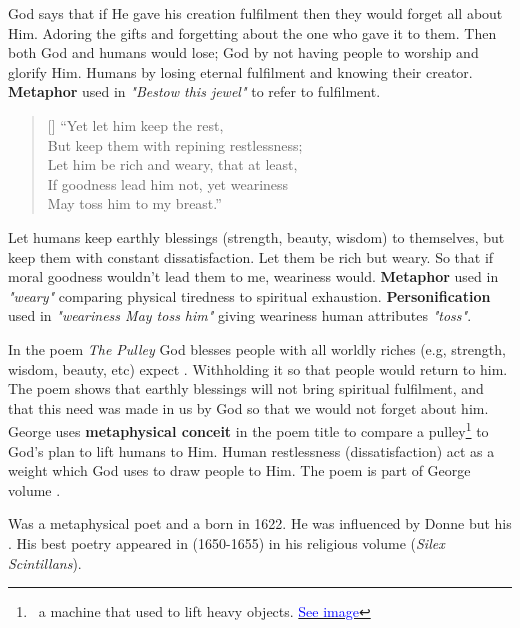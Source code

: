 God says that if He gave his creation fulfilment then they would 
forget all about Him. Adoring the gifts and forgetting 
about the one who gave it to them. Then both God and humans would
lose; God by not having people to worship and glorify Him. Humans by
losing eternal fulfilment and knowing their creator.  \textbf{Metaphor}
used in \textit{"Bestow this jewel"} to refer to fulfilment.

\begin{verse}[\versewidth]
{\fontverse
“Yet let him keep the rest,\\
But keep them with repining restlessness;\\
Let him be rich and weary, that at least,\\
If goodness lead him not, yet weariness\\
May toss him to my breast.”
} 
\end{verse}

Let humans keep earthly blessings (strength, beauty, wisdom) to
themselves, but keep them with constant dissatisfaction. Let them 
be rich but weary. So that if moral goodness wouldn't lead them
to me, weariness would. \textbf{Metaphor} used in \textit{"weary"}
comparing physical tiredness to spiritual exhaustion. \textbf{Personification}
used in \textit{"weariness May toss him"} giving weariness human attributes \textit{"toss"}.


In the poem \textit{The Pulley} God blesses people with all worldly riches
(e.g, strength, wisdom, beauty, etc) expect . Withholding
it so that people would return to him. The poem shows that earthly blessings will not
bring spiritual fulfilment, and that this need was made in us by God so that we would not forget
about him. George uses \textbf{metaphysical conceit} in the poem title to compare a pulley\footnote{
\, a machine that used to lift heavy objects.
\href{https://i.pinimg.com/736x/08/3b/ad/083badbb5a73ae0b9ae40093063f61e1.jpg}{\textcolor{blue}{See image}} }
to God's plan to lift humans to Him. Human restlessness (dissatisfaction) 
act as a weight which God uses to draw people to Him.
The poem is part of George volume .


Was a metaphysical poet and a  born in 1622.
He was influenced by Donne but his . His best poetry appeared in (1650-1655) in his
religious volume (\textit{Silex Scintillans}).


